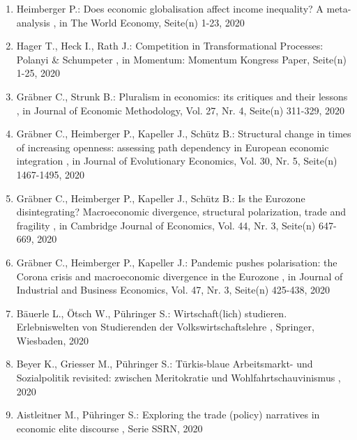\begin{enumerate}[leftmargin=*, labelsep=0.5cm]
	 \item Heimberger P.:  Does economic globalisation affect income inequality? A meta-analysis  , in The World Economy, Seite(n) 1-23, 2020
	 \item Hager T., Heck I., Rath J.:  Competition in Transformational Processes: Polanyi & Schumpeter  , in Momentum: Momentum Kongress Paper, Seite(n) 1-25, 2020
	 \item Gräbner C., Strunk B.:  Pluralism in economics: its critiques and their lessons  , in Journal of Economic Methodology, Vol. 27, Nr. 4, Seite(n) 311-329, 2020
	 \item Gräbner C., Heimberger P., Kapeller J., Schütz B.:  Structural change in times of increasing openness: assessing path dependency in European economic integration  , in Journal of Evolutionary Economics, Vol. 30, Nr. 5, Seite(n) 1467-1495, 2020
	 \item Gräbner C., Heimberger P., Kapeller J., Schütz B.:  Is the Eurozone disintegrating? Macroeconomic divergence, structural polarization, trade and fragility  , in Cambridge Journal of Economics, Vol. 44, Nr. 3, Seite(n) 647-669, 2020
	 \item Gräbner C., Heimberger P., Kapeller J.:  Pandemic pushes polarisation: the Corona crisis and macroeconomic divergence in the Eurozone  , in Journal of Industrial and Business Economics, Vol. 47, Nr. 3, Seite(n) 425-438, 2020
	 \item Bäuerle L., Ötsch W., Pühringer S.:  Wirtschaft(lich) studieren. Erlebniswelten von Studierenden der Volkswirtschaftslehre  , Springer, Wiesbaden, 2020
	 \item Beyer K., Griesser M., Pühringer S.:  Türkis-blaue Arbeitsmarkt- und Sozialpolitik revisited: zwischen Meritokratie und Wohlfahrtschauvinismus  , 2020
	 \item Aistleitner M., Pühringer S.:  Exploring the trade (policy) narratives in economic elite discourse  , Serie SSRN, 2020
\end{enumerate} 
